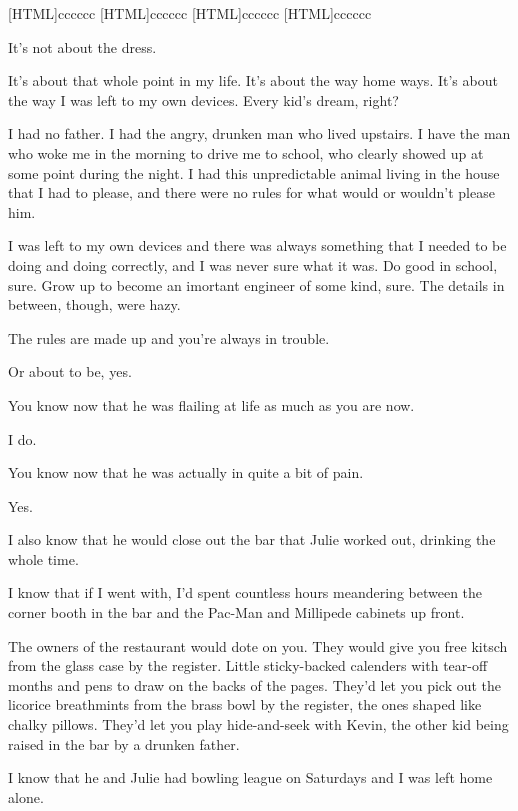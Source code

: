 \label{dad}
[HTML]{cccccc}
[HTML]{cccccc}
[HTML]{cccccc}
[HTML]{cccccc}
\begin{paracol}{2}
\begin{leftcolumn}

\end{leftcolumn}
\end{paracol}

\begin{paracol}{2}
\begin{leftcolumn}
It's not about the dress.

It's about that whole point in my life. It's about the way home ways. It's about the way I was left to my own devices. Every kid's dream, right?

I had no father. I had the angry, drunken man who lived upstairs. I have the man who woke me in the morning to drive me to school, who clearly showed up at some point during the night. I had this unpredictable animal living in the house that I had to please, and there were no rules for what would or wouldn't please him.

I was left to my own devices and there was always something that I needed to be doing and doing correctly, and I was never sure what it was. Do good in school, sure. Grow up to become an imortant engineer of some kind, sure. The details in between, though, were hazy.

\begin{ally}
The rules are made up and you're always in trouble.
\end{ally}
Or about to be, yes.

\begin{ally}
You know now that he was flailing at life as much as you are now.
\end{ally}
I do.

\begin{ally}
You know now that he was actually in quite a bit of pain.
\end{ally}
Yes.

I also know that he would close out the bar that Julie worked out, drinking the whole time.

I know that if I went with, I'd spent countless hours meandering between the corner booth in the bar and the Pac-Man and Millipede cabinets up front.

\begin{ally}
The owners of the restaurant would dote on you. They would give you free kitsch from the glass case by the register. Little sticky-backed calenders with tear-off months and pens to draw on the backs of the pages. They'd let you pick out the licorice breathmints from the brass bowl by the register, the ones shaped like chalky pillows. They'd let you play hide-and-seek with Kevin, the other kid being raised in the bar by a drunken father.
\end{ally}
I know that he and Julie had bowling league on Saturdays and I was left home alone.


\end{leftcolumn}
\end{paracol}
